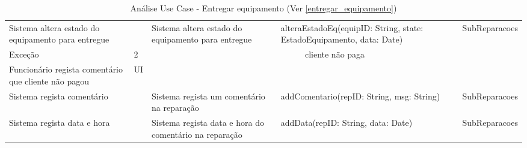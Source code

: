 \documentclass[../relatorio.tex]{subfiles}
\begin{document}
\begin{landscape}
\begin{table}[!h]
\begin{tabular}{|p{5cm}|p{1cm}|p{4cm}|p{6cm}|p{3cm}|}
                    &
                    &
            \\
            \hline
            Sistema altera estado do equipamento para entregue
                    & 
                    & Sistema altera estado do equipamento para entregue
                    & alteraEstadoEq(equipID: String, state: EstadoEquipamento, data: Date)
                    & SubReparacoes
            \\
            \hline
            \rowcolor{red!30}
            Exceção
                     & 
            2 
                     & 
            \multicolumn{3}{c}{cliente não paga}
            \\
            \hline
            \rowcolor{yellow}
            Funcionário regista comentário que cliente não pagou
                    & UI
                    &
                    &
                    &
            \\
            \hline
            Sistema regista comentário
                    & 
                    & Sistema regista um comentário na reparação
                    & addComentario(repID: String, msg: String)
                    & SubReparacoes
            \\
            \hline
            Sistema regista data e hora
                    & 
                    & Sistema regista data e hora do comentário na reparação
                    & addData(repID: String, data: Date)
                    & SubReparacoes
            \\
            \hline
        \end{tabular}
        \caption{Análise Use Case - Entregar equipamento (Ver \ref{entregar_equipamento})}
    \end{table}
\end{landscape}
\end{document}
